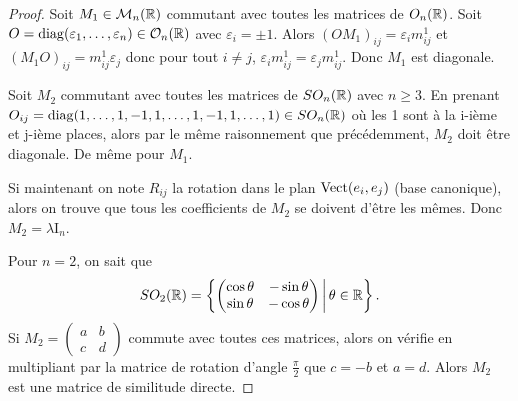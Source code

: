 \documentclass[12pt]{article}
\begin{document}
\begin{proof}
	Soit $M_1\in\mathcal{M}_n(\mathbb{R})$ commutant avec toutes les matrices de $O_n(\mathbb{R})$. Soit $O=\operatorname{diag}(\varepsilon_1,\dots,\varepsilon_{n})\in\mathcal{O}_n(\mathbb{R})$ avec $\varepsilon_{i}=\pm1$. Alors $(OM_1)_{ij}=\varepsilon_{i}m^{1}_{ij}$ et $(M_1O)_{ij}=m^{1}_{ij}\varepsilon_{j}$ donc pour tout $i\neq j$, $\varepsilon_{i}m_{ij}^{1}=\varepsilon_{j}m_{ij}^{1}$. Donc $M_{1}$ est diagonale.

	Soit $M_{2}$ commutant avec toutes les matrices de $SO_n(\mathbb{R})$ avec $n\geqslant3$. En prenant $O_{ij}=\operatorname{diag}(1,\dots,1,-1,1,\dots,1,-1,1,\dots,1)\in SO_n(\mathbb{R})$ où les 1 sont à la i-ième et j-ième places, alors par le même raisonnement que précédemment, $M_2$ doit être diagonale. De même pour $M_1$.

	Si maintenant on note $R_{ij}$ la rotation dans le plan $\operatorname{Vect}(e_{i},e_{j})$ (base canonique), alors on trouve que tous les coefficients de $M_2$ se doivent d'être les mêmes. Donc $M_2=\lambda\mathrm{I}_n$.

	Pour $n=2$, on sait que 
	\begin{equation*}
		SO_2(\mathbb{R})=\left\lbrace\begin{pmatrix}
			\cos\theta&-\sin\theta\\\sin\theta&-\cos\theta
		\end{pmatrix}\,\middle|\,\theta\in\mathbb{R}\right\rbrace.
	\end{equation*}
	Si $M_2=\begin{pmatrix}
		a&b\\c&d
	\end{pmatrix}$ commute avec toutes ces matrices, alors on vérifie en multipliant par la matrice de rotation d'angle $\frac{\pi}{2}$ que $c=-b$ et $a=d$. Alors $M_2$ est une matrice de similitude directe.
\end{proof}
\end{document}
